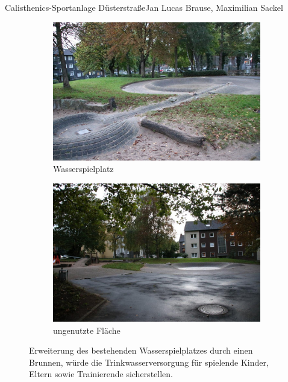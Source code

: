 \documentclass{../../templates/amendment}
\begin{document}
\begin{boxed}{Calisthenics-Sportanlage Düsterstraße}{Jan Lucas Brause, Maximilian Sackel}
    \begin{figure}[htpb]
        \centering
        \begin{subfigure}[]{0.49\textwidth}
            \begin{center}
                \includegraphics[width=\linewidth]{pictures/photo2.jpg}
                \caption{Wasserspielplatz}%
            \end{center}
        \end{subfigure}
        \begin{subfigure}[]{0.49\textwidth}
            \begin{center}
                \includegraphics[width=\linewidth]{pictures/photo4.jpg}
                \caption{ungenutzte Fläche}%
            \end{center}
        \end{subfigure}
        \caption{Erweiterung des bestehenden Wasserspielplatzes durch einen
                 Brunnen, würde die Trinkwasserversorgung für spielende Kinder, Eltern 
                 sowie Trainierende sicherstellen.}
    \end{figure}
\end{boxed}
\end{document}
